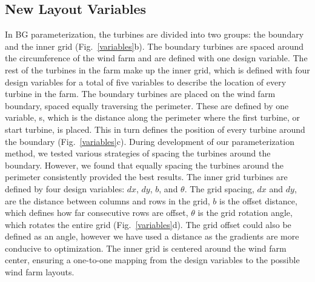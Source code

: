 \documentclass[wes, manuscript]{copernicus}
\begin{document}
\subsection{New Layout Variables}
In BG parameterization, the turbines are divided into two groups: the boundary and the inner grid (Fig.~\ref{variables}b). The boundary turbines are spaced around the circumference of the wind farm and are defined with one design variable. The rest of the turbines in the farm make up the inner grid, which is defined with four design variables for a total of five variables to describe the location of every turbine in the farm.
The boundary turbines are placed on the wind farm boundary, spaced equally traversing the perimeter. These are defined by one variable, s, which is the distance along the perimeter where the first turbine, or start turbine, is placed. This in turn defines the position of every turbine around the boundary (Fig.~\ref{variables}c). During development of our parameterization method, we tested various strategies of spacing the turbines around the boundary. However, we found that equally spacing the turbines around the perimeter consistently provided the best results.
%
The inner grid turbines are defined by four design variables: $dx$, $dy$, $b$, and $\theta$. 
The grid spacing, $dx$ and $dy$, are the distance between columns and rows in the grid, $b$ is the offset distance, which defines how far consecutive rows are offset, $\theta$ is the grid rotation angle, which rotates the entire grid (Fig.~\ref{variables}d). The grid offset could also be defined as an angle, however we have used a distance as the gradients are more conducive to optimization. The inner grid is centered around the wind farm center, ensuring a one-to-one mapping from the design variables to the possible wind farm layouts.
\end{document}
